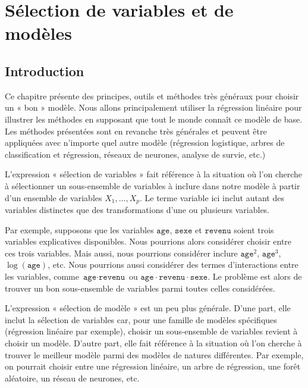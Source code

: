 \documentclass[
  11pt,
  letterpaper,
]{book}
\theoremstyle{definition}
\theoremstyle{remark}
\begin{document}

\hypertarget{selection-modele}{%
\chapter{Sélection de variables et de modèles}\label{selection-modele}}

\hypertarget{introduction-2}{%
\section{Introduction}\label{introduction-2}}

Ce chapitre présente des principes, outils et méthodes très généraux
pour choisir un « bon » modèle. Nous allons principalement utiliser la
régression linéaire pour illustrer les méthodes en supposant que tout le
monde connaît ce modèle de base. Les méthodes présentées sont en
revanche très générales et peuvent être appliquées avec n'importe quel
autre modèle (régression logistique, arbres de classification et
régression, réseaux de neurones, analyse de survie, etc.)

L'expression « sélection de variables » fait référence à la situation où
l'on cherche à sélectionner un sous-ensemble de variables à inclure dans
notre modèle à partir d'un ensemble de variables \(X_1, \ldots, X_p\).
Le terme variable ici inclut autant des variables distinctes que des
transformations d'une ou plusieurs variables.

Par exemple, supposons que les variables \(\texttt{age}\),
\(\texttt{sexe}\) et \(\texttt{revenu}\) soient trois variables
explicatives disponibles. Nous pourrions alors considérer choisir entre
ces trois variables. Mais aussi, nous pourrions considérer inclure
\(\texttt{age}^2\), \(\texttt{age}^3\), \(\log(\texttt{age})\), etc.
Nous pourrions aussi considérer des termes d'interactions entre les
variables, comme \(\texttt{age} \cdot \texttt{revenu}\) ou
\(\texttt{age}\cdot\texttt{revenu}\cdot\texttt{sexe}\). Le problème est
alors de trouver un bon sous-ensemble de variables parmi toutes celles
considérées.

L'expression « sélection de modèle » est un peu plus générale. D'une
part, elle inclut la sélection de variables car, pour une famille de
modèles spécifiques (régression linéaire par exemple), choisir un
sous-ensemble de variables revient à choisir un modèle. D'autre part,
elle fait référence à la situation où l'on cherche à trouver le meilleur
modèle parmi des modèles de natures différentes. Par exemple, on
pourrait choisir entre une régression linéaire, un arbre de régression,
une forêt aléatoire, un réseau de neurones, etc.
\end{document}

